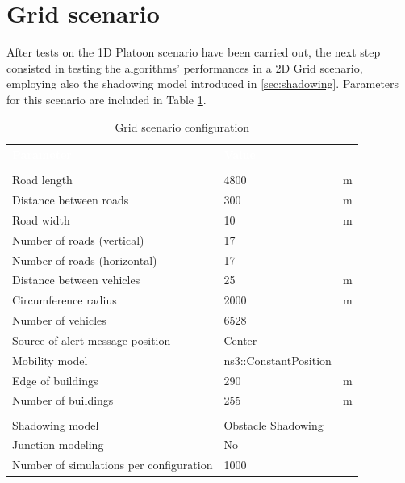 		
	\section{Grid scenario}
		After tests on the 1D Platoon scenario have been carried out, the next step consisted in testing the algorithms' performances in a 2D Grid scenario, employing also the shadowing model introduced in \ref{sec:shadowing}.
		Parameters for this scenario are included in Table \ref{tab:grid}.  
		
		\begin{table}[H]
			\def\arraystretch{1.1}
			\begin{tabularx}{\textwidth}{l | l  l}
				\rowcolor{I} {\large \textcolor{white}{Parameter}} & {\large \textcolor{white}{Value}} & {\large \textcolor{white}{}} \TBstrut  \\
				\toprule
				\endhead
				\rowcolor{P} \multicolumn{3}{c}{Scenario configuration} \\
				\midrule[1pt]
				Road length 							& 4800	 				& m		\\
				Distance between roads					& 300					& m		\\
				Road width								& 10					& m		\\
				Number of roads (vertical)				& 17					&		\\
				Number of roads (horizontal)			& 17					&		\\
				Distance between vehicles 				& 25					& m		\\
				Circumference radius					& 2000					& m		\\
				Number of vehicles						& 6528					& 		\\
				Source of alert message position		& Center				&		\\
				Mobility model							& ns3::ConstantPosition	&		\\
				Edge of buildings						& 290					& m		\\
				Number of buildings						& 255					& m		\\
				\midrule[1pt]
				\rowcolor{P} \multicolumn{3}{c}{Network configuration} \\
				\midrule[1pt]
				Shadowing model							& Obstacle Shadowing	&		\\
				Junction modeling						& No					&		\\
				\midrule[1pt]
				Number of simulations per configuration	& 1000					&		\\
				\bottomrule
			\end{tabularx}
			\caption{Grid scenario configuration}
			\label{tab:grid}
		\end{table}
	
